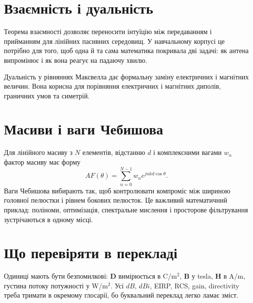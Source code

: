 \section{Взаємність і дуальність}

Теорема взаємності дозволяє переносити інтуїцію між передаванням і прийманням для лінійних пасивних середовищ. У навчальному корпусі це потрібно для того, щоб одна й та сама математика покривала дві задачі: як антена випромінює і як вона реагує на падаючу хвилю.

Дуальність у рівняннях Максвелла дає формальну заміну електричних і магнітних величин. Вона корисна для порівняння електричних і магнітних диполів, граничних умов та симетрій.

\section{Масиви і ваги Чебишова}

Для лінійного масиву з $N$ елементів, відстанню $d$ і комплексними вагами $w_n$ фактор масиву має форму
\begin{equation}
  AF(\theta)=\sum_{n=0}^{N-1}w_n e^{j n k d\cos\theta}.
\end{equation}
Ваги Чебишова вибирають так, щоб контролювати компроміс між шириною головної пелюстки і рівнем бокових пелюсток. Це важливий математичний приклад: поліноми, оптимізація, спектральне мислення і просторове фільтрування зустрічаються в одному місці.

\section{Що перевіряти в перекладі}

Одиниці мають бути безпомилкові: $\mathbf{D}$ вимірюється в C/m$^2$, $\mathbf{B}$ у tesla, $\mathbf{H}$ в A/m, густина потоку потужності у W/m$^2$. Усі $dB$, $dBi$, EIRP, RCS, gain, directivity треба тримати в окремому глосарії, бо буквальний переклад легко ламає зміст.
